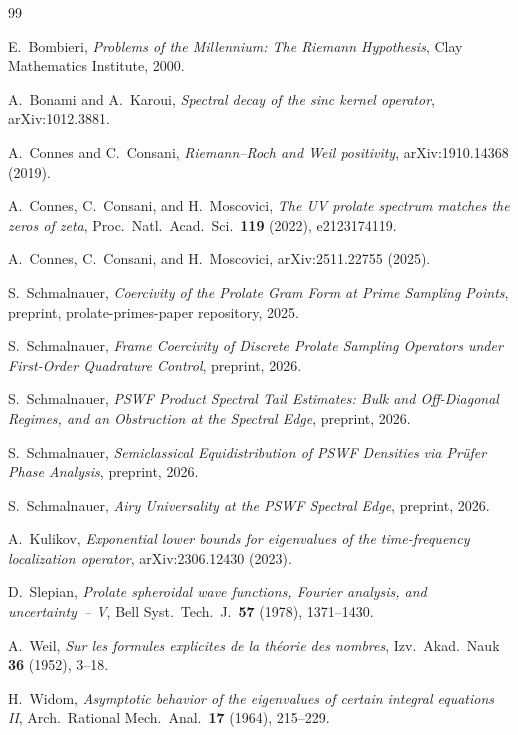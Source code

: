 \documentclass[12pt,a4paper]{amsart}
\theoremstyle{definition}
\begin{document}
\begin{thebibliography}{99}

E.~Bombieri,
\textit{Problems of the Millennium: The Riemann Hypothesis},
Clay Mathematics Institute, 2000.

A.~Bonami and A.~Karoui,
\textit{Spectral decay of the sinc kernel operator},
arXiv:1012.3881.

A.~Connes and C.~Consani,
\textit{Riemann--Roch and Weil positivity},
arXiv:1910.14368 (2019).

A.~Connes, C.~Consani, and H.~Moscovici,
\textit{The UV prolate spectrum matches the zeros of zeta},
Proc.\ Natl.\ Acad.\ Sci.\ \textbf{119} (2022), e2123174119.

A.~Connes, C.~Consani, and H.~Moscovici,
arXiv:2511.22755 (2025).

S.~Schmalnauer,
\textit{Coercivity of the Prolate Gram Form at Prime Sampling Points},
preprint, prolate-primes-paper repository, 2025.

S.~Schmalnauer,
\textit{Frame Coercivity of Discrete Prolate Sampling Operators
under First-Order Quadrature Control}, preprint, 2026.

S.~Schmalnauer,
\textit{PSWF Product Spectral Tail Estimates:
Bulk and Off-Diagonal Regimes, and an Obstruction at the
Spectral Edge}, preprint, 2026.

S.~Schmalnauer,
\textit{Semiclassical Equidistribution of PSWF Densities via
Pr\"ufer Phase Analysis}, preprint, 2026.

S.~Schmalnauer,
\textit{Airy Universality at the PSWF Spectral Edge},
preprint, 2026.

A.~Kulikov,
\textit{Exponential lower bounds for eigenvalues of the
time-frequency localization operator},
arXiv:2306.12430 (2023).

D.~Slepian,
\textit{Prolate spheroidal wave functions, Fourier analysis,
and uncertainty~-- V},
Bell Syst.\ Tech.\ J.\ \textbf{57} (1978), 1371--1430.

A.~Weil,
\textit{Sur les formules explicites de la th\'{e}orie des nombres},
Izv.\ Akad.\ Nauk \textbf{36} (1952), 3--18.

H.~Widom,
\textit{Asymptotic behavior of the eigenvalues of certain integral
equations II},
Arch.\ Rational Mech.\ Anal.\ \textbf{17} (1964), 215--229.

\end{thebibliography}
\end{document}
